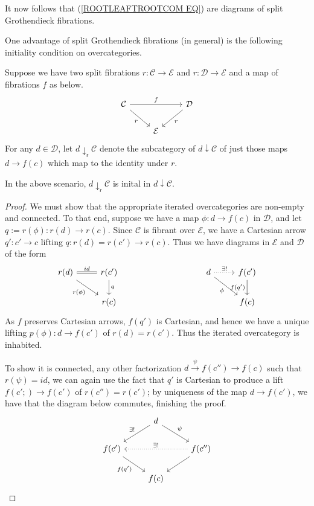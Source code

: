 \documentclass[a4paper,10pt]{article}%
\begin{document}
It now follows that (\ref{ROOTLEAFTROOTCOM EQ}) are diagrams of split Grothendieck fibrations.

One advantage of split Grothendieck fibrations (in general) is the following initiality condition on overcategories.
\begin{definition}
  Suppose we have two split fibrations $r: \mathcal C \to \mathcal E$ and $r: \mathcal D \to \mathcal E$ and a map of fibrations $f$ as below.
  \[
  \begin{tikzcd}
    \mathcal C \arrow[dr, "r"'] \arrow[rr, "f"] & & \mathcal D \arrow[dl, "r"]\\
    &     \mathcal E
  \end{tikzcd}
  \]  
  For any $d\in \mathcal D$, let $d \downarrow_{\mathsf r}\mathcal C$ denote the subcategory of $d\downarrow \mathcal C$ of just those maps $d \to f(c)$ which map to the identity under $r$.
\end{definition}
\begin{lemma}
  In the above scenario, $d \downarrow_{\mathsf r}\mathcal C$ is inital in $d\downarrow \mathcal C$.
\end{lemma}
\begin{proof}
  We must show that the appropriate iterated overcategories are non-empty and connected. To that end, suppose we have a map $\phi: d\to f(c)$ in $\mathcal D$, and let $q := r(\phi): r(d) \to r(c)$. Since $\mathcal C$ is fibrant over $\mathcal E$, we have a Cartesian arrow $q': c' \to c$ lifting $q: r(d) = r(c') \to r(c)$. Thus we have diagrams in $\mathcal E$ and $\mathcal D$ of the form
  \[
  \begin{tikzcd}
    r(d) \arrow[dr, "r(\phi)"'] \arrow[r, equal, "id"] & r(c') \arrow[d, "q"] &\qquad \qquad & d \arrow[dr, "\phi"'] \arrow[r, dotted, "\exists!"] & f(c') \arrow[d, "f(q')"'] \\
    & r(c) & & & f(c)
  \end{tikzcd}
  \]
  As $f$ preserves Cartesian arrows, $f(q')$ is Cartesian, and hence we have a unique lifting $p(\phi): d \to f(c')$ of $r(d) = r(c')$. Thus the iterated overcategory is inhabited.

  To show it is connected, any other factorization $d \xrightarrow{\psi} f(c'') \to f(c)$ such that $r(\psi) = id$, we can again use the fact that $q'$ is Cartesian to produce a lift $f(c';) \to f(c')$ of $r(c'') = r(c')$; by uniqueness of the map $d \to f(c')$, we have that the diagram below commutes, finishing the proof.
  \[
  \begin{tikzcd}
    & d \arrow[dl, "\exists!"'] \arrow[dr, "\psi"] & \\
    f(c') \arrow[dr, "f(q')"']  && f(c'') \arrow[ll, dotted, "\exists!"'] \arrow[dl]\\
    & f(c)
  \end{tikzcd}
  \]
\end{proof}
\end{document}
